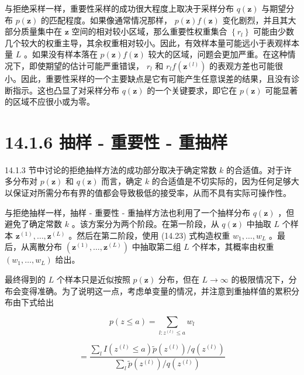 \documentclass[10pt]{report}
\begin{document}
与拒绝采样一样，重要性采样的成功很大程度上取决于采样分布 \(q\left( \mathbf{z}\right)\) 与期望分布 \(p\left( \mathbf{z}\right)\) 的匹配程度。如果像通常情况那样， \(p\left( \mathbf{z}\right) f\left( \mathbf{z}\right)\) 变化剧烈，并且其大部分质量集中在 \(\mathbf{z}\) 空间的相对较小区域，那么重要性权重集合 \(\left\{  {r}_{l}\right\}\) 可能由少数几个较大的权重主导，其余权重相对较小。因此，有效样本量可能远小于表观样本量 \(L\) 。如果没有样本落在 \(p\left( \mathbf{z}\right) f\left( \mathbf{z}\right)\) 较大的区域，问题会更加严重。在这种情况下，即使期望的估计可能严重错误， \({r}_{l}\) 和 \({r}_{l}f\left( {\mathbf{z}}^{\left( l\right) }\right)\) 的表观方差也可能很小。因此，重要性采样的一个主要缺点是它有可能产生任意误差的结果，且没有诊断指示。这也凸显了对采样分布 \(q\left( \mathbf{z}\right)\) 的一个关键要求，即它在 \(p\left( \mathbf{z}\right)\) 可能显著的区域不应很小或为零。

\section*{14.1.6 抽样 - 重要性 - 重抽样}

14.1.3 节中讨论的拒绝抽样方法的成功部分取决于确定常数 \(k\) 的合适值。对于许多分布对 \(p\left( \mathbf{z}\right)\) 和 \(q\left( \mathbf{z}\right)\) 而言，确定 \(k\) 的合适值是不切实际的，因为任何足够大以保证对所需分布有界的值都会导致极低的接受率，从而不具有实际可操作性。

与拒绝抽样一样，抽样 - 重要性 - 重抽样方法也利用了一个抽样分布 \(q\left( \mathbf{z}\right)\) ，但避免了确定常数 \(k\) 。该方案分为两个阶段。在第一阶段，从 \(q\left( \mathbf{z}\right)\) 中抽取 \(L\) 个样本 \({\mathbf{z}}^{\left( 1\right) },\ldots ,{\mathbf{z}}^{\left( L\right) }\) 。然后在第二阶段，使用 (14.23) 式构造权重 \({w}_{1},\ldots ,{w}_{L}\) 。最后，从离散分布 \(\left( {{\mathbf{z}}^{\left( 1\right) },\ldots ,{\mathbf{z}}^{\left( L\right) }}\right)\) 中抽取第二组 \(L\) 个样本，其概率由权重 \(\left( {{w}_{1},\ldots ,{w}_{L}}\right)\) 给出。

最终得到的 \(L\) 个样本只是近似按照 \(p\left( \mathbf{z}\right)\) 分布，但在 \(L \rightarrow  \infty\) 的极限情况下，分布会变得准确。为了说明这一点，考虑单变量的情况，并注意到重抽样值的累积分布由下式给出

\[
p\left( {z \leq  a}\right)  = \mathop{\sum }\limits_{{l : {z}^{\left( l\right) } \leq  a}}{w}_{l}
\]

\[
= \frac{\mathop{\sum }\limits_{l}I\left( {{z}^{\left( l\right) } \leq  a}\right) \widetilde{p}\left( {z}^{\left( l\right) }\right) /q\left( {z}^{\left( l\right) }\right) }{\mathop{\sum }\limits_{l}\widetilde{p}\left( {z}^{\left( l\right) }\right) /q\left( {z}^{\left( l\right) }\right) } \tag{14.24}
\]
\end{document}
